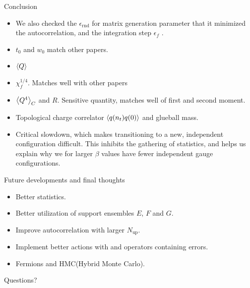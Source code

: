 \documentclass[10pt,show notes on second screen]{beamer}
\begin{document}
\begin{frame}{Conclusion}
{\begin{itemize}
    \item <4->We also checked the $\epsilon_\mathrm{rnd}$ for matrix generation parameter that it minimized the autocorrelation, and the integration step $\epsilon_f$ .
    \item <5->$t_0$ and $w_0$ match other papers.
    \item <6->$\left\langle{Q}\right\rangle$
    \item <7->$\chi^{1/4}_f$. Matches well with other papers
    \item <8->$\left\langle{Q^4}\right\rangle_C$ and $R$. Sensitive quantity, matches well of first and second moment.
    \item <9->Topological charge correlator $\left\langle{q(n_t)q(0)}\right\rangle$ and glueball mass.
    \item <10->Critical slowdown, which makes transitioning to a new, independent configuration difficult. This inhibits the gathering of statistics, and helps us explain why we for larger $\beta$ values have fewer independent gauge configurations.
\end{itemize}
}
\end{frame}

\begin{frame}{Future developments and final thoughts}
\begin{itemize}[<+->]
    \item Better statistics.
    \item Better utilization of support ensembles $E$, $F$ and $G$.
    \item Improve autocorrelation with larger $N_\mathrm{up}$.
    \item Implement better actions with and operators containing errors.
    \item Fermions and HMC(Hybrid Monte Carlo).
\end{itemize}
\end{frame}

\begin{frame}
\vline{5.0pt}
\begin{center}
Questions?
\end{center}
\end{frame}


\begin{frame}

\end{frame}
\end{document}
